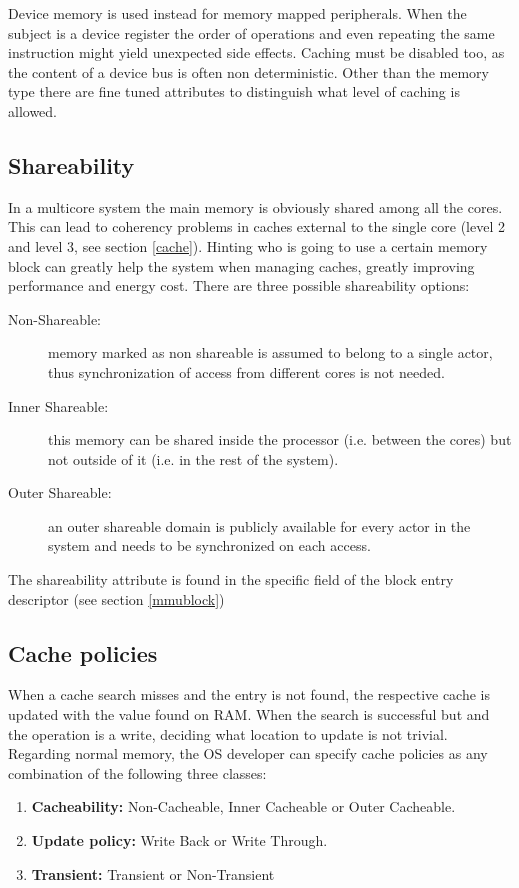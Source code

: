 \documentclass[12pt,a4paper,openright,twoside]{report}
\begin{document}
Device memory is used instead for memory mapped peripherals. When the subject is
a device register the order of operations and even repeating the same instruction
might yield unexpected side effects. Caching must be disabled too, as the content
of a device bus is often non deterministic.
Other than the memory type there are fine tuned attributes to distinguish
what level of caching is allowed.

\subsection{Shareability}
In a multicore system the main memory is obviously shared among all the cores.
This can lead to coherency problems in caches external to the single core (level 2
and level 3, see section \ref{cache}). Hinting who is going to use a certain memory
block can greatly help the system when managing caches, greatly improving performance
and energy cost. There are three possible
shareability options:
\begin{description}
    \item[Non-Shareable:] memory marked as non shareable is assumed to belong to
        a single actor, thus synchronization of access from different cores is 
        not needed.
    \item[Inner Shareable:] this memory can be shared inside the processor (i.e. 
        between the cores) but not outside of it (i.e. in the rest of the system).
    \item[Outer Shareable:] an outer shareable domain is publicly available for 
        every actor in the system and needs to be synchronized on each access.
\end{description}
The shareability attribute is found in the specific field of the block entry descriptor
(see section \ref{mmublock})

\subsection{Cache policies}
When a cache search misses and the entry is not found, the respective cache is 
updated with the value found on RAM. When the search is successful but and the
operation is a write, deciding what location to update is not trivial. \\

Regarding normal memory, the OS developer can specify cache policies as any combination
of the following three classes:

\begin{enumerate}
    \item \textbf{Cacheability:} Non-Cacheable, Inner Cacheable or Outer Cacheable.
    \item \textbf{Update policy:} Write Back or Write Through.
    \item \textbf{Transient:} Transient or Non-Transient
\end{enumerate}
\end{document}
